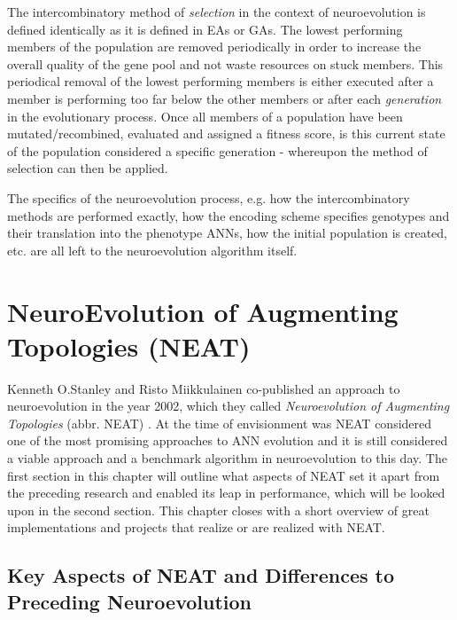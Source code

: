 \documentclass[journal, a4paper]{IEEEtran}
\begin{document}
The intercombinatory method of \textit{selection} in the context of neuroevolution is defined identically as it is defined in EAs or GAs. The lowest performing members of the population are removed periodically in order to increase the overall quality of the gene pool and not waste resources on stuck members. This periodical removal of the lowest performing members is either executed after a member is performing too far below the other members or after each \textit{generation} in the evolutionary process. Once all members of a population have been mutated/recombined, evaluated and assigned a fitness score, is this current state of the population considered a specific generation - whereupon the method of selection can then be applied.

The specifics of the neuroevolution process, e.g. how the intercombinatory methods are performed exactly, how the encoding scheme specifies genotypes and their translation into the phenotype ANNs, how the initial population is created, etc. are all left to the neuroevolution algorithm itself.




\section{NeuroEvolution of Augmenting Topologies (NEAT)} \label{sec:neat}

Kenneth O.Stanley and Risto Miikkulainen co-published an approach to neuroevolution in the year 2002, which they called \textit{Neuroevolution of Augmenting Topologies} (abbr. NEAT) \cite{sta02_1}. At the time of envisionment was NEAT considered one of the most promising approaches to ANN evolution and it is still considered a viable approach and a benchmark algorithm in neuroevolution to this day. The first section in this chapter will outline what aspects of NEAT set it apart from the preceding research and enabled its leap in performance, which will be looked upon in the second section. This chapter closes with a short overview of great implementations and projects that realize or are realized with NEAT.



\subsection{Key Aspects of NEAT and Differences to Preceding Neuroevolution}
\end{document}
